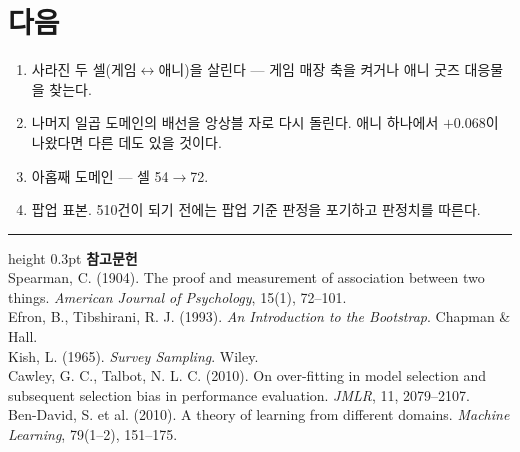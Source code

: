\documentclass[10pt]{article}
\begin{document}
\section{다음}

\begin{enumerate}[leftmargin=1.3em,itemsep=0.15em]
\item 사라진 두 셀(게임$\leftrightarrow$애니)을 살린다 --- 게임 매장 축을 켜거나
      애니 굿즈 대응물을 찾는다.
\item 나머지 일곱 도메인의 배선을 앙상블 자로 다시 돌린다. 애니 하나에서
      $+$0.068이 나왔다면 다른 데도 있을 것이다.
\item 아홉째 도메인 --- 셀 54$\to$72.
\item 팝업 표본. 510건이 되기 전에는 팝업 기준 판정을 포기하고 판정치를 따른다.
\end{enumerate}

\vspace{0.6em}
\hrule height 0.3pt
\vspace{0.5em}
{\footnotesize
\textbf{참고문헌}\\[0.3em]
Spearman, C. (1904). The proof and measurement of association between two things.
\emph{American Journal of Psychology}, 15(1), 72--101.\\[0.15em]
Efron, B., Tibshirani, R. J. (1993). \emph{An Introduction to the Bootstrap}.
Chapman \& Hall.\\[0.15em]
Kish, L. (1965). \emph{Survey Sampling}. Wiley.\\[0.15em]
Cawley, G. C., Talbot, N. L. C. (2010). On over-fitting in model selection and
subsequent selection bias in performance evaluation. \emph{JMLR}, 11, 2079--2107.\\[0.15em]
Ben-David, S. et al. (2010). A theory of learning from different domains.
\emph{Machine Learning}, 79(1--2), 151--175.
}
\end{document}
